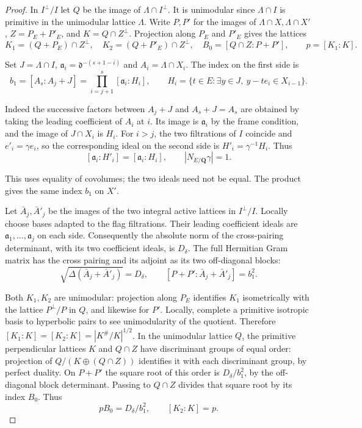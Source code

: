 \begin{proof}
In \(I^\perp/I\) let \(Q\) be the image of
\(\Lambda\cap I^\perp\). It is unimodular since
\(\Lambda\cap I\) is primitive in the unimodular lattice \(\Lambda\).
Write \(P,P'\) for the images of \(\Lambda\cap X,\Lambda\cap X'\),
\(Z=P_E+P'_E\), and \(K=Q\cap Z^\perp\).
Projection along \(P_E\) and \(P'_E\) gives the lattices
\[
 K_1=(Q+P_E)\cap Z^\perp,\quad
 K_2=(Q+P'_E)\cap Z^\perp,\quad
 B_0=[Q\cap Z:P+P'],\qquad p=[K_1:K].
\]

Set \(J=\Lambda\cap I\), \(\mathfrak a_i=\mathfrak d^{-(s+1-i)}\)
and \(A_i=\Lambda\cap X_i\). The index on the first side is
\[
 b_1=[A_s:A_j+J]=\prod_{i=j+1}^{s}[\mathfrak a_i:H_i],
 \qquad H_i=\{t\in E:\exists y\in J,\ y-te_i\in X_{i-1}\}.
\]

Indeed the successive factors between \(A_j+J\) and \(A_s+J=A_s\)
are obtained by taking the leading coefficient of \(A_i\) at \(i\).
Its image is \(\mathfrak a_i\) by the frame condition, and the
image of \(J\cap X_i\) is \(H_i\). For \(i>j\), the two filtrations
of \(I\) coincide and \(e'_i=\gamma e_i\), so the corresponding
ideal on the second side is \(H'_i=\gamma^{-1}H_i\). Thus
\[
 [\mathfrak a_i:H'_i]=[\mathfrak a_i:H_i],\qquad
 |N_{E/\mathbf Q}\gamma|=1 .
\]

This uses equality of covolumes; the two ideals need not be equal.
The product gives the same index \(b_1\) on \(X'\).

Let \(\bar A_j,\bar A'_j\) be the images of the two integral
active lattices in \(I^\perp/I\). Locally choose bases adapted
to the flag filtrations. Their leading coefficient ideals are
\(\mathfrak a_1,\ldots,\mathfrak a_j\) on each side. Consequently
the absolute norm of the cross-pairing determinant, with its two
coefficient ideals, is \(D_\delta\). The full Hermitian Gram matrix
has the cross pairing and its adjoint as its two off-diagonal blocks:
\[
 \sqrt{\Delta(\bar A_j+\bar A'_j)}=D_\delta,\qquad
 [P+P':\bar A_j+\bar A'_j]=b_1^2 .
\]

Both \(K_1,K_2\) are unimodular: projection along \(P_E\)
identifies \(K_1\) isometrically with the lattice \(P^\perp/P\)
in \(Q\), and likewise for \(P'\). Locally, complete a primitive
isotropic basis to hyperbolic pairs to see unimodularity of the
quotient. Therefore \([K_1:K]=[K_2:K]=|K^\#/K|^{1/2}\).
In the unimodular lattice \(Q\), the primitive perpendicular
lattices \(K\) and \(Q\cap Z\) have discriminant groups of equal
order: projection of \(Q/(K\oplus(Q\cap Z))\) identifies it
with each discriminant group, by perfect duality. On \(P+P'\)
the square root of this order is \(D_\delta/b_1^2\), by the
off-diagonal block determinant. Passing to \(Q\cap Z\) divides
that square root by its index \(B_0\). Thus
\[
          pB_0=D_\delta/b_1^2,\qquad [K_2:K]=p .
\]


\end{proof}
